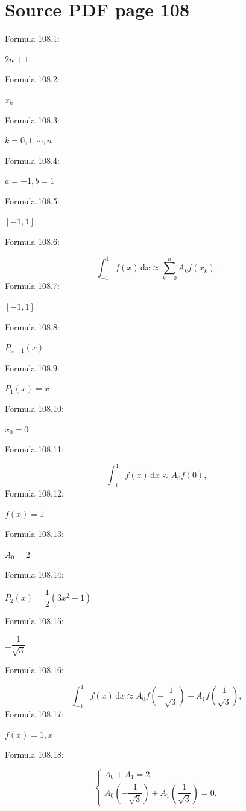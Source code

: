 \documentclass[11pt]{article}
\begin{document}
\section*{Source PDF page 108}
\noindent Formula 108.1:\par
$2n+1$\par
\noindent Formula 108.2:\par
$x_k$\par
\noindent Formula 108.3:\par
$k=0,1,\cdots,n$\par
\noindent Formula 108.4:\par
$a=-1,b=1$\par
\noindent Formula 108.5:\par
$[-1,1]$\par
\noindent Formula 108.6:\par
\[
\int_{-1}^{1}f(x)\,\mathrm{d}x\approx\sum_{k=0}^{n}A_kf(x_k).
\tag{4.4.4}
\]
\noindent Formula 108.7:\par
$[-1,1]$\par
\noindent Formula 108.8:\par
$P_{n+1}(x)$\par
\noindent Formula 108.9:\par
$P_1(x)=x$\par
\noindent Formula 108.10:\par
$x_0=0$\par
\noindent Formula 108.11:\par
\[
\int_{-1}^{1}f(x)\,\mathrm{d}x\approx A_0f(0),
\]
\noindent Formula 108.12:\par
$f(x)=1$\par
\noindent Formula 108.13:\par
$A_0=2$\par
\noindent Formula 108.14:\par
$P_2(x)=\dfrac12(3x^2-1)$\par
\noindent Formula 108.15:\par
$\pm\dfrac1{\sqrt3}$\par
\noindent Formula 108.16:\par
\[
\int_{-1}^{1}f(x)\,\mathrm{d}x\approx
A_0f\left(-\frac1{\sqrt3}\right)+A_1f\left(\frac1{\sqrt3}\right),
\]
\noindent Formula 108.17:\par
$f(x)=1,x$\par
\noindent Formula 108.18:\par
\[
\begin{cases}
A_0+A_1=2,\\[3pt]
A_0\left(-\dfrac1{\sqrt3}\right)+A_1\left(\dfrac1{\sqrt3}\right)=0.
\end{cases}
\]
\end{document}
